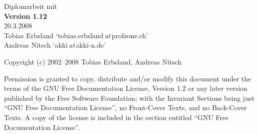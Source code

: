%
%

\begin{titlepage}
	\vspace*{7cm}
	\begin{center}
		\Huge
		Diplomarbeit mit \DMLLaTeX\\
		\vspace{1cm}
		\large
		\textbf{Version 1.12}\\
		20.3.2008\\
		\vspace{2cm}
		Tobias Erbsland \enquote*{tobias.erbsland\,\emph{at}\,profzone.ch}\\
		Andreas Nitsch \enquote*{akki\,\emph{at}\,akki-n.de}\\
	\end{center}
	\normalsize
	\vfill
	Copyright (c)  2002--2008  Tobias Erbsland, Andreas Nitsch

Permission is granted to copy, distribute and/or modify this document
under the terms of the GNU Free Documentation License, Version 1.2
or any later version published by the Free Software Foundation;
with the Invariant Sections being just \enquote{GNU Free Documentation License},
no Front-Cover Texts, and no Back-Cover Texts.
A copy of the license is included in the section entitled \enquote{GNU
Free Documentation License}.
	
\end{titlepage}

\tableofcontents

\listoffigures

\listoftables


%
%
